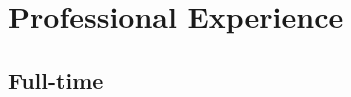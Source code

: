 \documentclass[11pt,a4paper,roman]{moderncv}
\begin{document}
\makecvtitle



\newcommand\seeabovedesc{(\textit{See description above.})}

\newcommand\daterange[2]{#1\,--\,#2}

\newcommand\altamont{Altamont, Tennessee, USA}
\newcommand\austin{Austin, Texas, USA}
\newcommand\centurion{Centurion, South Africa}
\newcommand\chattanooga{Chattanooga, Tennessee, USA}
\newcommand\chippewafalls{Chippewa Falls, Wisconsin, USA}
\newcommand\london{London, UK}
\newcommand\portland{Portland, Oregon, USA}
\newcommand\pretoria{Pretoria, South Africa}
\newcommand\sanfrancisco{San Francisco, California, USA}
\newcommand\stlouis{St. Louis, Missouri, USA}
\newcommand\utrecht{Utrecht, The Netherlands}
\newcommand\whitemarsh{White Marsh, Maryland, USA}

\newcommand\uu{Utrecht University}
\newcommand\wustl{Washington University in St. Louis}
\newcommand\wustlshort{Washington University}
\newcommand\ut{University of Texas at Austin}


\section{Professional Experience}


\subsection{Full-time}
\end{document}
